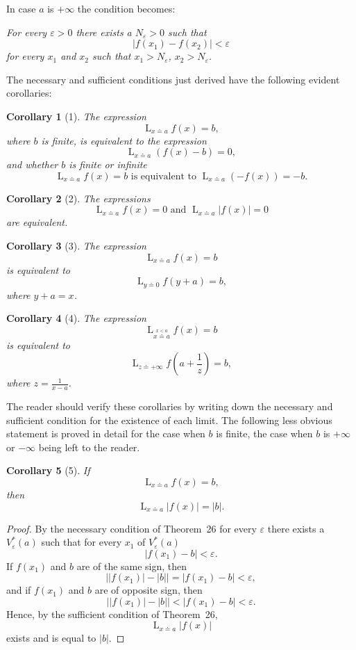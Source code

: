 \documentclass[a4paper,12pt]{book}[2004/02/16]
\providecommand{\hyperlink}[2]{#2}
\providecommand{\hypertarget}[2]{#2}
\theoremstyle{ilemma}
\theoremstyle{itheorem}
\theoremstyle{iother}
\theoremstyle{icorollary}
\theoremstyle{numcorollary}
\newtheorem{ncorollary}{Corollary}
\theoremstyle{idefinition}
\begin{document}
In case $a$ is $+\infty$ the condition becomes:

\textit{For every $\varepsilon >0$ there exists a $N_\varepsilon>0$ such
that}
\[
  |f(x_1)-f(x_2)|<\varepsilon
\]
\textit{for every $x_1$ and $x_2$ such that $x_1>N_\varepsilon$,
$x_2>N_\varepsilon$.}

The necessary and sufficient conditions just derived have the
following evident corollaries:

\begin{ncorollary}[1]\hypertarget{cor1th27}{}
The expression
\[
  \mathop{L}_{x \doteq a}f(x)=b,
\]
where $b$ is finite, is equivalent to the expression
\[
  \mathop{L}_{x \doteq a}(f(x)-b)=0,
\]
and whether $b$ is finite or infinite
\[
  \mathop{L}_{x \doteq a} f(x) =b \text{ is equivalent to }
  \mathop{L}_{x \doteq a} (-f(x)) =-b.
\]
\end{ncorollary}
\begin{ncorollary}[2]\hypertarget{cor2th27}
The expressions
\[
  \mathop{L}_{x \doteq a} f(x) = 0 \text{ and }
  \mathop{L}_{x \doteq a} |f(x)|= 0
\]
are equivalent.
\end{ncorollary}
\begin{ncorollary}[3]
The expression
\[
  \mathop{L}_{x \doteq a} f(x)=b
\]
is equivalent to
\[
  \mathop{L}_{y \doteq 0} f(y+a)=b,
\]
where $y+a=x$.
\end{ncorollary}

\begin{ncorollary}[4]
The expression
\[
  \mathop{L}_{\stackrel{x < a}{x \doteq a}} f(x)=b
\]
is equivalent to
\[
  \mathop{L}_{z \doteq + \infty} f \left({a + \frac1z}\right) = b,
\]
where $z = \frac{1}{x-a}$.
\end{ncorollary}
The reader should verify these corollaries by writing down the
necessary and sufficient condition for the existence of each
limit. The following less obvious statement is proved in detail for
the case when $b$ is finite, the case when $b$ is $+ \infty$ or
$-\infty$ being left to the reader.

\begin{ncorollary}[5]
If
\[
  \mathop{L}_{x \doteq a} f(x) = b,
\]
then
\[
  \mathop{L}_{x \doteq a} |f(x)| = |b|.
\]
\end{ncorollary}
\begin{proof}
By the necessary condition of Theorem~\hyperlink{thm26}{26} for every $\varepsilon$ there
exists a $V_{\varepsilon}^*(a)$ such that for every $x_1$ of
$V_{\varepsilon}^*(a)$
\[
  |f(x_1)-b|< \varepsilon.
\]
If $f(x_1)$ and $b$ are of the same sign, then
\[
  \bigl||f(x_1)|-|b|\bigr|
= |f(x_1)-b|< \varepsilon,
\]
and if $f(x_1)$ and $b$ are of opposite sign, then
\[
  \bigl||f(x_1)|-|b|\bigr|
  < |f(x_1)-b|< \varepsilon.
\]
Hence, by the sufficient condition of Theorem~\hyperlink{thm26}{26},
\[
  \mathop{L}_{x \doteq a} |f(x)|
\]
exists and is equal to $|b|$.
\end{proof}
\end{document}
